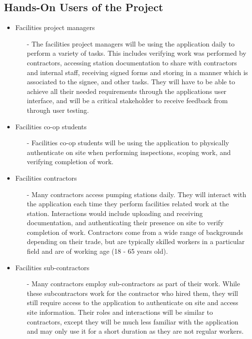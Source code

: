 \documentclass[12pt]{article}
\begin{document}
\subsection{Hands-On Users of the Project}
\begin{itemize}
    \item Facilities project managers
    \begin{itemize}
        \item[-] The facilities project managers will be using the application
        daily to perform a variety of tasks. This includes verifying work was
        performed by contractors, accessing station documentation to share with
        contractors and internal staff, receiving signed forms and storing in a
        manner which is associated to the signee, and other tasks.
        They will have to be able to achieve all their needed requirements 
        through the applications user interface, and will be a critical
        stakeholder to receive feedback from through user testing.
    \end{itemize}
    \item Facilities co-op students
    \begin{itemize}
        \item[-] Facilities co-op students will be using the application to
        physically authenticate on site when performing inspections, 
        scoping work, and verifying completion of work.
    \end{itemize}
    \item Facilities contractors
    \begin{itemize}
        \item[-] Many contractors access pumping stations daily. They will
        interact with the application each time they perform facilities related
        work at the station. Interactions would include uploading and 
        receiving documentation, and authenticating their presence on site 
        to verify completion of work.
        Contractors come from a wide range of backgrounds depending on their
        trade, but are typically skilled workers in a particular field and are
        of working age (18 - 65 years old).
    \end{itemize}
    \item Facilities sub-contractors
    \begin{itemize}
        \item[-] Many contractors employ sub-contractors as part of their work.
        While these subcontractors work for the contractor who hired them, they
        will still require access to the application to authenticate on site
        and access site information. Their roles and interactions
        will be similar to contractors, except they will be much less familiar
        with the application and may only use it for a short duration as they 
        are not regular workers.
    \end{itemize}
\end{itemize}
\end{document}
